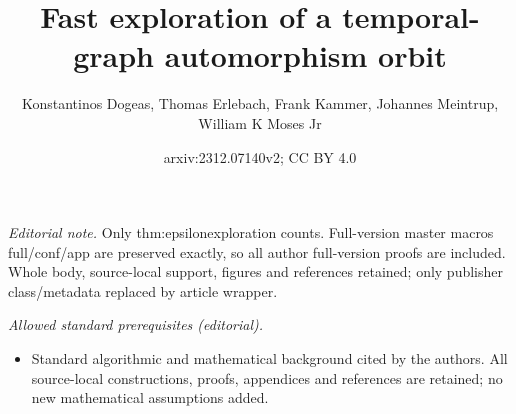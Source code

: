 \documentclass[10pt,a4paper]{article}
\title{Fast exploration of a temporal-graph automorphism orbit}
\author{Konstantinos Dogeas, Thomas Erlebach, Frank Kammer, Johannes Meintrup, William K Moses Jr}
\date{arxiv:2312.07140v2; CC BY 4.0}
\begin{document}
\maketitle
\noindent\textit{Editorial note.} Only thm:epsilonexploration counts. Full-version master macros full/conf/app are preserved exactly, so all author full-version proofs are included. Whole body, source-local support, figures and references retained; only publisher class/metadata replaced by article wrapper.\par\medskip
\noindent\textit{Allowed standard prerequisites (editorial).}\begin{itemize}
\item Standard algorithmic and mathematical background cited by the authors. All source-local constructions, proofs, appendices and references are retained; no new mathematical assumptions added.
\end{itemize}\medskip
\end{document}
